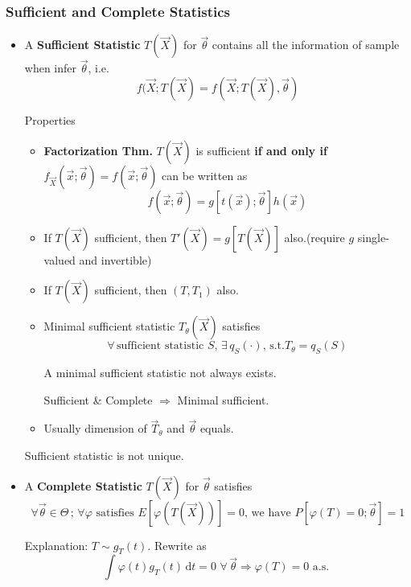\documentclass[11pt,a4paper]{ctexart}
\numberwithin{equation}{section}%
\begin{document}
\subsubsection{Sufficient and Complete Statistics}\label{SubSectionSufficient_CompleteStatistics}
    \begin{itemize}
        \item A \textbf{Sufficient Statistic} $T(\vec{X})$ for $\vec{\theta}$ contains all the information of sample when infer $\vec{\theta}$, i.e.
        \[
            f(\vec{X};T(\vec{X})=f(\vec{X};T(\vec{X}),\vec{\theta})
        \]

        Properties
        \begin{itemize}
            \item \textbf{Factorization Thm.} $T(\vec{X})$ is sufficient \textbf{if and only if} $f_{\vec{X}}(\vec{x};\vec{\theta})=f(\vec{x};\vec{\theta})$ can be written as 
            \[
                f(\vec{x};\vec{\theta})=g[t(\vec{x});\vec{\theta}]h(\vec{x})
            \]            
            \item If $T(\vec{X})$ sufficient, then $T'(\vec{X})=g[T(\vec{X})]$ also.(require $g$ single-valued and invertible)
            \item If $T(\vec{X})$ sufficient, then $(T,T_1)$ also.
            \item Minimal sufficient statistic $T_\theta(\vec{X})$ satisfies 
            \[
                \forall\,\text{sufficient statistic }S,\,\exists\, q_S(\cdot),\, \text{s.t.} T_\theta=q_S(S)
            \]

            A minimal sufficient statistic not always exists.

            Sufficient \& Complete $\Rightarrow $ Minimal sufficient.
            \item Usually dimension of $\vec{T}_\theta$ and $\vec{\theta}$ equals.
        \end{itemize}
        
        Sufficient statistic is not unique.



        \item A \textbf{Complete Statistic} $T(\vec{X})$ for $\vec{\theta}$ satisfies
        \[
            \forall\vec{\theta}\in\Theta\, ;\,\forall\varphi\text{ satisfies }E[\varphi(T(\vec{X}))]=0\text{, we have }P[\varphi(T)=0;\vec{\theta}]=1
        \]

        Explanation: $T\sim g_T(t)$. Rewrite as
        \[
            \int\varphi (t) g_T(t)\,\mathrm{d} t=0  \,\,\forall\, \vec{\theta}\Rightarrow\varphi(T)=0 \text{  a.s. }
        \]


\end{itemize}
\end{document}
